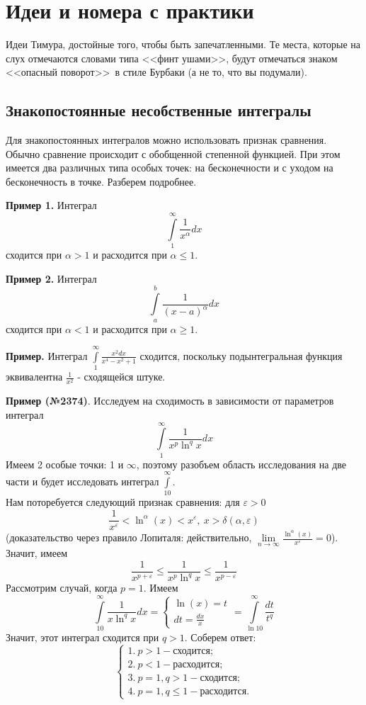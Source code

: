 \chapter{Идеи и номера с практики}
Идеи Тимура, достойные того, чтобы быть запечатленными.
Те места, которые на слух отмечаются словами типа <<финт ушами>>, будут 
отмечаться знаком <<опасный поворот>>~\dbend в стиле Бурбаки (а не то, что
вы подумали). 

\section{Знакопостоянные несобственные интегралы}
Для знакопостоянных интегралов можно использовать признак сравнения.
Обычно сравнение происходит с обобщенной степенной функцией.
При этом имеется два различных типа особых точек: на бесконечности и 
с уходом на бесконечность в точке. Разберем подробнее.

\textbf{Пример 1.} Интеграл 
$$\int\limits_{1}^{\infty}\frac{1}{x^\alpha}dx$$ 
сходится при $\alpha>1$ и расходится при $\alpha\leqslant 1$.

\textbf{Пример 2.} Интеграл
$$\int\limits_{a}^{b}\frac{1}{(x-a)^\alpha}dx$$
сходится при $\alpha<1$ и расходится при $\alpha\geqslant 1$. 

\textbf{Пример.} Интеграл $\int\limits_{1}^{\infty} \frac{x^2dx}{x^4-x^2+1}$ 
сходится, поскольку подынтегральная функция эквивалентна $\frac{1}{x^2}$ - 
сходящейся штуке.


\textbf{Пример (№2374)}. Исследуем на сходимость в зависимости от параметров
интеграл
$$\int\limits_{1}^{\infty} \frac{1}{x^p\ln^q x}dx$$
Имеем 2 особые точки: 1 и $\infty$, поэтому разобъем область исследования
на две части и будет исследовать интеграл $\int\limits_{10}^{\infty}$.\\
Нам поторебуется следующий признак сравнения: для $\varepsilon>0$
$$\frac{1}{x^\varepsilon}<\ln^\alpha(x)<x^\varepsilon,~
x>\delta(\alpha,\varepsilon)$$ 
(доказательство через правило Лопиталя: действительно, 
$\lim\limits_{n \to \infty} \frac{\ln^\alpha(x)}{x^\varepsilon}=0$).\\
Значит, имеем
$$\frac{1}{x^{p+\varepsilon}}\leqslant \frac{1}{x^p\ln^qx}\leqslant 
\frac{1}{x^{p-\varepsilon}}$$ 
Рассмотрим случай, когда $p=1$. Имеем 
$$\int\limits_{10}^{\infty} \frac{1}{x\ln^qx}dx = 
\begin{cases}\ln(x)=t\\dt=\frac{dx}{x}\end{cases} = 
\int\limits_{\ln 10}^{\infty}\frac{dt}{t^q}$$ 
Значит, этот интеграл сходится при $q>1$.
Соберем ответ:
$$\begin{cases}
    1.~ p>1 - \text{сходится;}\\
    2.~ p<1 - \text{расходится;}\\
    3.~ p=1,q>1 - \text{сходится;}\\
    4.~ p=1,q\leqslant 1 - \text{расходится.}
\end{cases}$$



